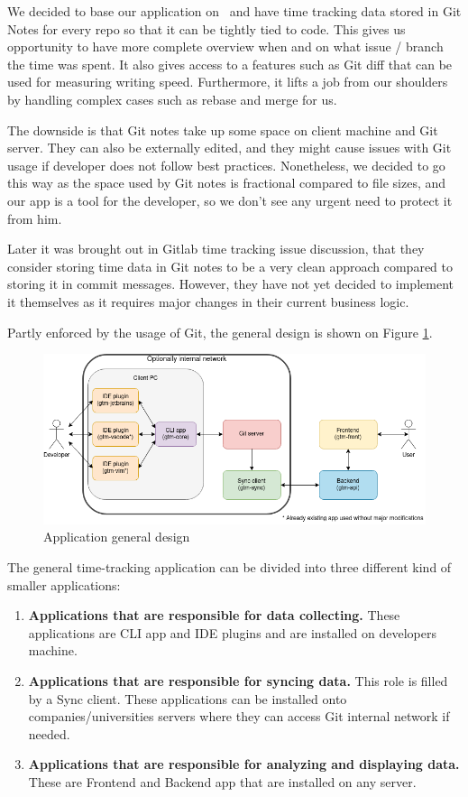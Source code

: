We decided to base our application on~ and have time tracking data stored in Git Notes for every repo so that it can be tightly tied to code.
This gives us opportunity to have more complete overview when and on what issue / branch the time was spent.
It also gives access to a features such as Git diff that can be used for measuring writing speed.
Furthermore, it lifts a job from our shoulders by handling complex cases such as rebase and merge for us.

The downside is that Git notes take up some space on client machine and Git server.
They can also be externally edited, and they might cause issues with Git usage if developer does not follow best practices.
Nonetheless, we decided to go this way as the space used by Git notes is fractional compared to file sizes, and our app is a tool for the developer,
so we don't see any urgent need to protect it from him.

Later it was brought out in Gitlab time tracking issue discussion, that they consider storing time data in Git notes
to be a very clean approach compared to storing it in commit messages.
However, they have not yet decided to implement it themselves as it requires major changes in their current business logic.
\cite{gitlab-time-issue}

Partly enforced by the usage of Git, the general design is shown on Figure
\ref{fig:project-archidecture}.

\begin{figure}[h]
    \includegraphics[width=\textwidth]{figures/project_archidecture}
    \caption{Application general design}
    \label{fig:project-archidecture}
\end{figure}

The general time-tracking application can be divided into three different kind of smaller applications:
\begin{enumerate}
    \item \textbf{Applications that are responsible for data collecting.} These applications are CLI app and IDE plugins and are installed on developers machine.
    \item \textbf{Applications that are responsible for syncing data.} This role is filled by a Sync client.
    These applications can be installed onto companies/universities servers where they can access Git internal network if needed.
    \item \textbf{Applications that are responsible for analyzing and displaying data.} These are Frontend and Backend app that are installed on any server.
\end{enumerate}

